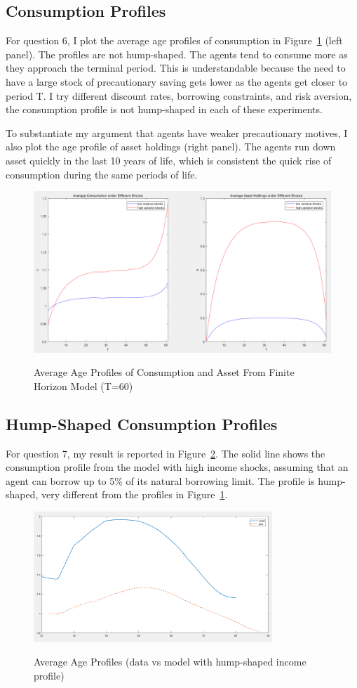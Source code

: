 \documentclass[thmsa,10pt]{article}
\begin{document}
\subsection{Consumption Profiles}
For question 6, I plot the average age profiles of consumption in Figure~\ref{fig:consprof} (left panel). The profiles are not hump-shaped. The agents tend to consume more as they approach the terminal period. This is understandable because the need to have a large stock of precautionary saving gets lower as the agents get closer to period T. I try different discount rates, borrowing constraints, and risk aversion, the consumption profile is not hump-shaped in each of these experiments. 

To substantiate my argument that agents have weaker precautionary motives, I also plot the age profile of asset holdings (right panel). The agents run down asset quickly in the last 10 years of life, which is consistent the quick rise of consumption during the same periods of life. 

\begin{figure}[h!]
\centering
\caption{Average Age Profiles of Consumption and Asset From Finite Horizon Model (T=60)}
\includegraphics[width=12cm]{./figs/simulationT}
\label{fig:consprof}
\end{figure}


\subsection{Hump-Shaped Consumption Profiles}
For question 7, my result is reported in Figure~\ref{fig:hump}. The solid line shows the consumption profile from the model with high income shocks, assuming that an agent can borrow up to 5\% of its natural borrowing limit. The profile is hump-shaped, very different from the profiles in Figure~\ref{fig:consprof}.

\begin{figure}[h!]
\centering
\caption{Average Age Profiles (data vs model with hump-shaped income profile)}
\includegraphics[width=9cm]{./figs/hump}
\label{fig:hump}
\end{figure}
\end{document}
